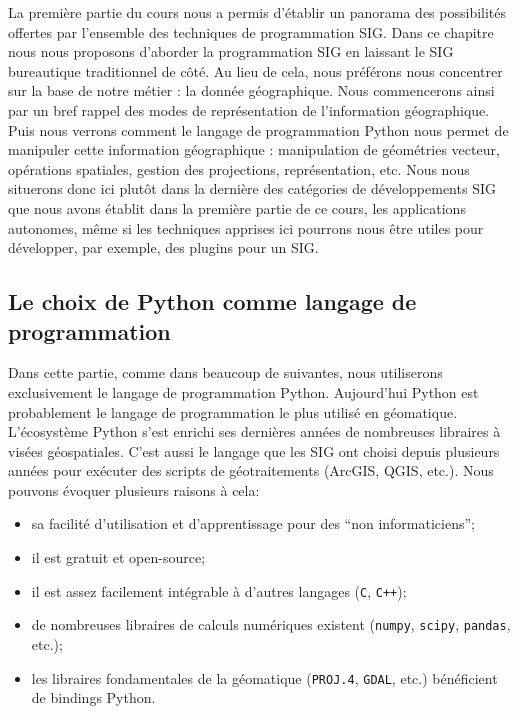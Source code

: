 \documentclass[11pt]{article}
\newcommand{\passthrough}[1]{#1}
\def\tightlist{}
\begin{document}
La première partie du cours nous a permis d'établir un panorama des
possibilités offertes par l'ensemble des techniques de programmation
SIG. Dans ce chapitre nous nous proposons d'aborder la programmation SIG
en laissant le SIG bureautique traditionnel de côté. Au lieu de cela,
nous préférons nous concentrer sur la base de notre métier : la donnée
géographique. Nous commencerons ainsi par un bref rappel des modes de
représentation de l'information géographique. Puis nous verrons comment
le langage de programmation Python nous permet de manipuler cette
information géographique : manipulation de géométries vecteur,
opérations spatiales, gestion des projections, représentation, etc. Nous
nous situerons donc ici plutôt dans la dernière des catégories de
développements SIG que nous avons établit dans la première partie de ce
cours, les applications autonomes, même si les techniques apprises ici
pourrons nous être utiles pour développer, par exemple, des plugins pour
un SIG.

\hypertarget{le-choix-de-python-comme-langage-de-programmation}{%
\subsection{Le choix de Python comme langage de
programmation}\label{le-choix-de-python-comme-langage-de-programmation}}

Dans cette partie, comme dans beaucoup de suivantes, nous utiliserons
exclusivement le langage de programmation Python. Aujourd'hui Python est
probablement le langage de programmation le plus utilisé en géomatique.
L'écosystème Python s'est enrichi ses dernières années de nombreuses
libraires à visées géospatiales. C'est aussi le langage que les SIG ont
choisi depuis plusieurs années pour exécuter des scripts de
géotraitements (ArcGIS, QGIS, etc.). Nous pouvons évoquer plusieurs
raisons à cela:

\begin{itemize}
\tightlist
\item
  sa facilité d'utilisation et d'apprentissage pour des ``non
  informaticiens'';
\item
  il est gratuit et open-source;
\item
  il est assez facilement intégrable à d'autres langages
  (\passthrough{\lstinline!C!}, \passthrough{\lstinline!C++!});
\item
  de nombreuses libraires de calculs numériques existent
  (\passthrough{\lstinline!numpy!}, \passthrough{\lstinline!scipy!},
  \passthrough{\lstinline!pandas!}, etc.);
\item
  les libraires fondamentales de la géomatique
  (\passthrough{\lstinline!PROJ.4!}, \passthrough{\lstinline!GDAL!},
  etc.) bénéficient de bindings Python.
\end{itemize}
\end{document}
